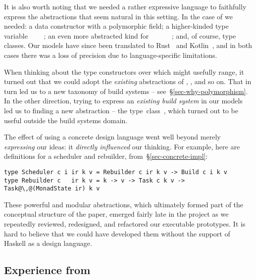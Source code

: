 It is also worth noting that we needed a rather expressive language
to faithfully express the abstractions that seem natural in this
setting.  In the case of  we needed: a data constructor with a
polymorphic field; a higher-kinded type variable ~\hs{::}~\hs{*}~\hs{->}~\hs{*}; an
even more abstracted kind for ~\hs{::}~\hs{(*}~\hs{->}~\hs{*)}~\hs{->}~; and,
of course, type classes. Our models have since been translated to
Rust~\cite{translation_rust} and Kotlin~\cite{translation_kotlin}, and in both
cases there was a loss of precision due to language-specific limitations.

When thinking about the type constructors over which  might usefully
range, it turned out that we could adopt the \emph{existing} abstractions
of , ,  and so on.
That in turn led us to a new taxonomy
of build systems -- see~\S\ref{sec-why-polymorphism}. In the other direction,
trying to express an \emph{existing build system} \Dune in our models led us to
finding a new abstraction -- the  \mbox{type
class~\cite{mokhov_selective_2019}}, which turned out to be useful outside the
build systems domain.

The effect of using a concrete design language went well beyond
merely \emph{expressing} our ideas: it \emph{directly influenced}
our thinking.  For example, here are definitions for a scheduler and rebuilder,
from~\S\ref{sec-concrete-impl}:

\vspace{0.5mm}
\begin{verbatim}
type Scheduler c i ir k v = Rebuilder c ir k v -> Build c i k v
type Rebuilder c   ir k v = k -> v -> Task c k v -> Task@\,@(MonadState ir) k v
\end{verbatim}
\vspace{0.5mm}

\noindent
These powerful and modular abstractions, which ultimately formed part
of the conceptual structure of the paper, emerged fairly late in the
project as we repeatedly reviewed, redesigned, and refactored our
executable prototypes. It is hard to believe that we could have
developed them without the support of Haskell as a design language.

\subsection{Experience from \Shake}\label{sec-experience-shake}

